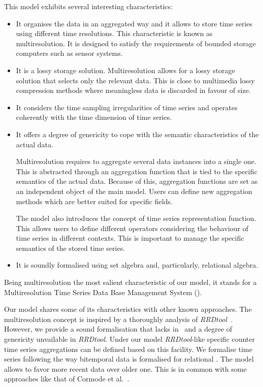This model exhibits several interesting characteristics:
\begin{itemize}
\item It organises the data in an aggregated way and it allows to
  store time series using different time resolutions. This
  characteristic is known as multiresolution. It is designed to
  satisfy the requirements of bounded storage computers such as sensor
  systems.

\item It is a lossy storage solution. Multiresolution allows for a
  lossy storage solution that selects only the relevant data. This is
  close to multimedia lossy compression methods where meaningless data
  is discarded in favour of size. 

\item It considers the time sampling irregularities of time series and
  operates coherently with the time dimension of time series.

\item It offers a degree of genericity to cope with the semantic
  characteristics of the actual data. 

  Multiresolution requires to aggregate several data instances into a
  single one. This is abstracted through an aggregation function that
  is tied to the specific semantics of the actual data. Because of
  this, aggregation functions are set as an independent object of the
  main model.  Users can define new aggregation methods which are
  better suited for specific fields.

  The model also introduces the concept of time series representation
  function.  This allows users to define different operators
  considering the behaviour of time series in different contexts. This
  is important to manage the specific semantics of the stored time
  series. 

\item It is soundly formalised using set algebra and, particularly,
  relational algebra.
\end{itemize}

Being multiresolution the most salient characteristic of our model, it
stands for a Multiresolution Time Series Data Base Management System
().

Our model shares some of its characteristics with other known
approaches.
%
The multiresolution concept is inspired by a thoroughly analysis of
\emph{RRDtool}~\cite{rrdtool}. However, we provide a sound
formalisation that lacks in~\cite{rrdtool} and a degree of genericity
unvailable in \emph{RRDtool}. Under our model \emph{RRDtool}-like
specific counter time series aggregations can be defined based on this
facility.
%
We formalise time series following the way bitemporal data is
formalised for relational .
%
The model allows to favor more recent data over older one. This is in
common with some approaches like that of Cormode et
al.~\cite{cormode08:pods}.

